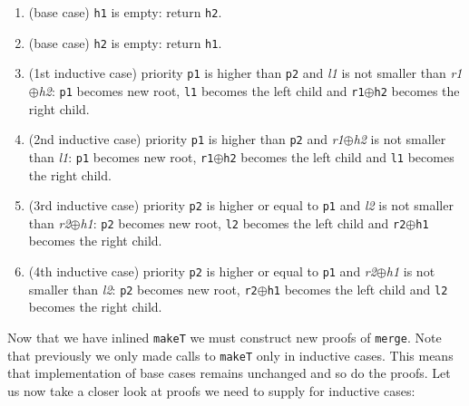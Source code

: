\begin{enumerate}
 \item (base case) \texttt{h1} is empty: return \texttt{h2}.
 \item (base case) \texttt{h2} is empty: return \texttt{h1}.
 \item (1st inductive case) priority \texttt{p1} is higher than \texttt{p2} and \textit{l1} is not smaller than  \textit{r1}$\oplus$\textit{h2}: \texttt{p1} becomes new root, \texttt{l1} becomes the left child and \texttt{r1}$\oplus$\texttt{h2} becomes the right child.
 \item (2nd inductive case) priority \texttt{p1} is higher than \texttt{p2} and \textit{r1}$\oplus$\textit{h2} is not smaller than \textit{l1}: \texttt{p1} becomes new root, \texttt{r1}$\oplus$\texttt{h2} becomes the left child and \texttt{l1} becomes the right child.
 \item (3rd inductive case) priority \texttt{p2} is higher or equal to \texttt{p1} and \textit{l2} is not smaller than  \textit{r2}$\oplus$\textit{h1}: \texttt{p2} becomes new root, \texttt{l2} becomes the left child and \texttt{r2}$\oplus$\texttt{h1} becomes the right child.
 \item (4th inductive case) priority \texttt{p2} is higher or equal to \texttt{p1} and \textit{r2}$\oplus$\textit{h1} is not smaller than  \textit{l2}: \texttt{p2} becomes new root, \texttt{r2}$\oplus$\texttt{h1} becomes the left child and \texttt{l2} becomes the right child.
\end{enumerate}
\noindent
Now that we have inlined \texttt{makeT} we must construct new proofs of \texttt{merge}. Note that previously we only made calls to \texttt{makeT} only in inductive cases. This means that implementation of base cases remains unchanged and so do the proofs. Let us now take a closer look at proofs we need to supply for inductive cases:

